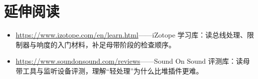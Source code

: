\section*{延伸阅读}
\begin{itemize}[leftmargin=1.5em]
\item \url{https://www.izotope.com/en/learn.html}——iZotope 学习库：读总线处理、限制器与响度的入门材料，补足母带阶段的检查顺序。
\item \url{https://www.soundonsound.com/reviews}——Sound On Sound 评测库：读母带工具与监听设备评测，理解“轻处理”为什么比堆插件更难。
\end{itemize}
